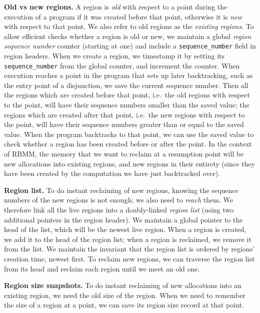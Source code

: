 \documentclass{tlp}
\newcommand{\code}[1]{{\tt#1}}
\begin{document}
\noindent\textbf{Old vs new regions.}
A region is \emph{old} with respect to a point
during the execution of a program if it was created before that point,
otherwise it is \emph{new} with respect to that point.
We also refer to old regions as the \emph{existing regions}.
To allow efficient checks whether a region is old or new,
we maintain a global \emph{region sequence number} counter (starting at one)
and include a \code{sequence\_number} field in region headers.
When we create a region,
we timestamp it by setting its \code{sequence\_number} from the global counter,
and increment the counter.
When execution reaches a point in the program that sets up later backtracking,
such as the entry point of a disjunction,
we save the current sequence number.
Then all the regions which are created before that point,
i.e.\ the old regions with respect to the point,
will have their sequence numbers smaller than the saved value;
the regions which are created after that point,
i.e.\ the new regions with respect to the point,
will have their sequence numbers greater than or equal to the saved value.
When the program backtracks to that point, we can use the saved value
to check whether a region has been created before or after the point.
In the context of RBMM,
the memory that we want to reclaim at a resumption point
will be new allocations into existing regions,
and new regions in their entirety
(since they have been created
by the computation we have just backtracked over).

\noindent\textbf{Region list.}
To do instant reclaiming of new regions,
knowing the sequence numbers of the new regions is not enough;
we also need to \emph{reach} them.
We therefore link all the live regions into a doubly-linked \emph{region list}
(using two additional pointers in the region header).
We maintain a global pointer to the head of the list,
which will be the newest live region.
When a region is created, we add it to the head of the region list;
when a region is reclaimed, we remove it from the list.
We maintain the invariant that
the region list is ordered by regions' creation time, newest first.
To reclaim new regions,
we can traverse the region list from its head
and reclaim each region until we meet an old one.

\noindent\textbf{Region size snapshots.}
To do instant reclaiming of new allocations into an existing region,
we need the old size of the region.
When we need to remember the size of a region at a point,
we can save its region size record at that point.
\end{document}
